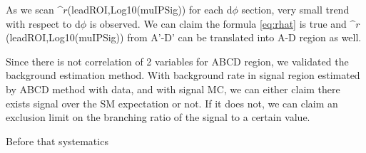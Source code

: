 As we scan $\^{r}$(leadROI,Log10(muIPSig)) for each d$\phi$ section, very small trend with respect to d$\phi$ is observed.
We can claim the formula \ref{eq:rhat} is true and $\^{r}$(leadROI,Log10(muIPSig)) from A'-D' can be translated into A-D region as well.


Since there is not correlation of 2 variables for ABCD region, we validated the background estimation method.
With background rate in signal region estimated by ABCD method with data, and with signal MC, we can either claim there exists signal over the SM expectation or not.
If it does not, we can claim an exclusion limit on the branching ratio of the signal to a certain value.


Before that systematics




